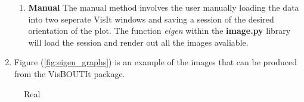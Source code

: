 \documentclass[12pt,a4paper]{article}
\begin{document}
\begin{enumerate}
\begin{enumerate}
		\item{\textbf{Manual} The manual method involves the user manually loading the data into two seperate VisIt windows and saving a session of the desired orientation of the plot. The function \textit{eigen} within the \textbf{image.py} library will load the session and render out all the images avaliable.}
	
	\end{enumerate}
	\item{Figure (\ref{fig:eigen_graphs}) is an example of the images that can be produced from the VisBOUTIt package.}
\end{enumerate}


\begin{figure}[H]
	\centering
	\begin{minipage}[H]{0.75\textwidth}
		\caption{Real}
		\label{fig:eigen_real}
	\end{minipage}%
	\hfill
	\begin{minipage}[H]{0.75\textwidth}

\end{minipage}
\end{figure}
\end{document}
